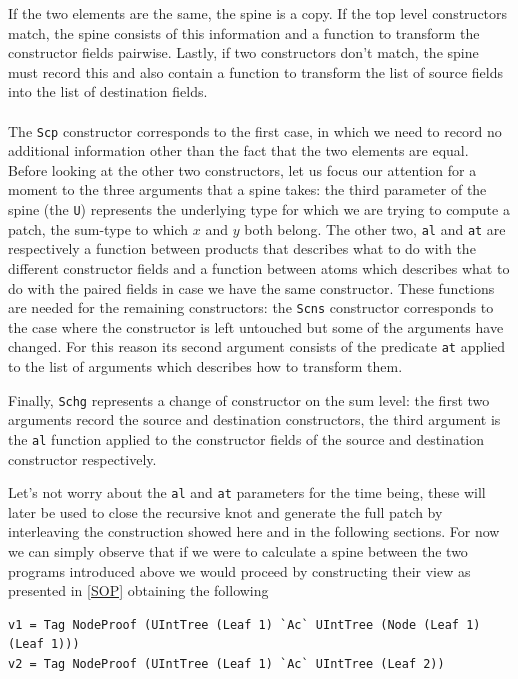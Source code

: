 \documentclass[11pt, titlepage]{article}
\begin{document}
If the two
elements are the same, the spine is a copy. If the top level
constructors match, the spine consists of this information and a function to
transform the constructor fields pairwise. Lastly, if two constructors
don't match, the spine must record this and also contain a function to
transform the list of source fields into the list of destination fields.
\\\\
The \texttt{Scp} constructor corresponds to the first case, in which we need
to record no additional information other than the fact that the two
elements are equal. 
Before looking at the other two constructors, let us focus our attention for a moment to the three arguments that a spine takes:
the third parameter of the spine (the \texttt{U}) represents the
underlying type for which we are trying to compute a patch, the sum-type to which $x$ and $y$ both belong.
The other two, \texttt{al} and \texttt{at} are respectively a
function between products that describes what to do with the different
constructor fields and a function between atoms which describes what to
do with the paired fields in case we have the same constructor.
These functions are needed for the remaining constructors: the \texttt{Scns} constructor corresponds to the 
case where the constructor is left untouched but some of the arguments have changed.
For this reason its second argument consists of the predicate \texttt{at} applied to the list of arguments which describes
how to transform them. 

Finally, \texttt{Schg} represents a change of constructor on the sum level: the first two arguments record the
source and destination constructors, the third argument is the
\texttt{al} function applied to the constructor fields of the source and
destination constructor respectively.

Let's not worry about the \texttt{al} and \texttt{at} parameters for the time 
being, these will later be used to close the recursive knot and generate the full patch by interleaving
the construction showed here and in the following sections. 
For now we can simply observe that if we were to calculate a spine between the 
two programs introduced above we would proceed by constructing their view as 
presented in \ref{SOP} obtaining the following

\begin{verbatim}
v1 = Tag NodeProof (UIntTree (Leaf 1) `Ac` UIntTree (Node (Leaf 1) (Leaf 1)))
v2 = Tag NodeProof (UIntTree (Leaf 1) `Ac` UIntTree (Leaf 2))
\end{verbatim}
\end{document}
